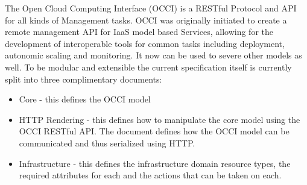 The Open Cloud Computing Interface (OCCI) is a RESTful Protocol and
API for all kinds of
Management tasks. OCCI was originally initiated to create a remote
management API for IaaS model based Services, allowing for the
development of interoperable tools for common tasks including
deployment, autonomic scaling and monitoring. It now can be used to
severe other models as well. To be modular and extensible the current
specification itself is currently split into three complimentary
documents:

\begin{itemize}
\item Core - this defines the OCCI model
\item HTTP Rendering - this defines how to manipulate the core model
  using the OCCI RESTful API. The document defines how the OCCI model
  can be communicated and thus serialized using HTTP.
\item Infrastructure - this defines the infrastructure domain resource
  types, the required attributes for each and the actions that can be
  taken on each.
\end{itemize}
